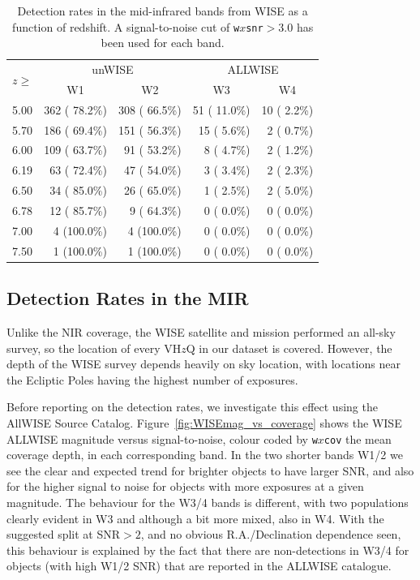 \documentclass[usenatbib]{mnras}
\begin{document}
  
\begin{table}
  \centering
  \begin{tabular}{l r r r r}
    \hline \hline
    \multirow{ 2}{*}{$z \geq$} & \multicolumn{2}{c}{unWISE} &  \multicolumn{2}{c}{ALLWISE}   \\ 
                                             & \multicolumn{1}{c}{W1} & \multicolumn{1}{c}{W2} & \multicolumn{1}{c}{W3} & \multicolumn{1}{c}{W4}  \\ 
    \hline
    5.00   &   362 ( 78.2\%)   &   308 ( 66.5\%)  &    51 ( 11.0\%)  &    10 (  2.2\%) \\ 
    5.70   &   186 ( 69.4\%)   &   151 ( 56.3\%)  &    15 (  5.6\%)  &     2 (  0.7\%) \\ 
    6.00   &   109 ( 63.7\%)   &    91 ( 53.2\%)  &     8 (  4.7\%)  &     2 (  1.2\%) \\ 
    6.19   &    63 ( 72.4\%)   &    47 ( 54.0\%)  &     3 (  3.4\%)  &     2 (  2.3\%) \\ 
    6.50   &    34 ( 85.0\%)   &    26 ( 65.0\%)  &     1 (  2.5\%)  &     2 (  5.0\%) \\ 
    6.78   &    12 ( 85.7\%)   &     9 ( 64.3\%)  &     0 (  0.0\%)  &     0 (  0.0\%) \\ 
    7.00   &     4 (100.0\%)   &     4 (100.0\%)  &     0 (  0.0\%)  &     0 (  0.0\%) \\ 
    7.50   &     1 (100.0\%)   &     1 (100.0\%)  &     0 (  0.0\%)  &     0 (  0.0\%) \\ 
    \hline \hline
  \end{tabular}
  \caption{Detection rates in the mid-infrared bands from WISE as a function of 
    redshift. A signal-to-noise cut of {\tt w$x$snr}$>3.0$ has been used for each band.}
  \label{tab:WFCAM_vs_VISTA}
\end{table}


\subsection{Detection Rates in the MIR}
Unlike the NIR coverage, the WISE satellite and mission performed an all-sky survey, so the location of every VH$z$Q in our dataset is covered. However, the depth of the WISE survey depends heavily on sky location, with locations near the Ecliptic Poles having the highest number of exposures.

Before reporting on the detection rates, we investigate this effect using the AllWISE Source Catalog. Figure~\ref{fig:WISEmag_vs_coverage} shows the WISE ALLWISE magnitude versus signal-to-noise, colour coded by {\tt w$x$cov} the mean coverage depth, in each corresponding band. In the two shorter bands W1/2 we see the clear and expected trend for brighter objects to have larger SNR, and also for the higher signal to noise for objects with more exposures at a given magnitude. The behaviour for the W3/4 bands is different, with two populations clearly evident in W3 and although a bit more mixed, also in W4. With the suggested split at SNR$>2$, and no obvious R.A./Declination dependence seen, this behaviour is explained by the fact that there are non-detections in W3/4 for objects (with high W1/2 SNR) that are reported in the ALLWISE catalogue.
\end{document}

